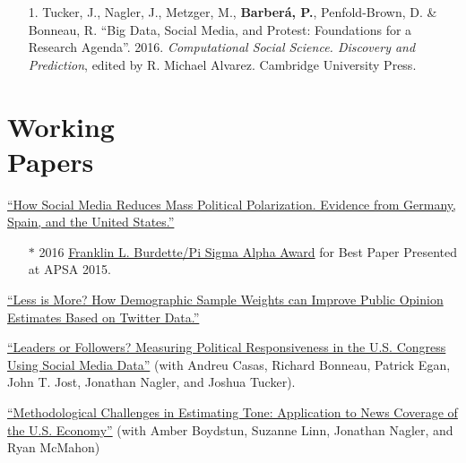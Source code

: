 \documentclass[margin,line,11pt]{resume}
\begin{document}
\begin{resume}
\begin{itemize}[leftmargin=5.5mm]
\item[1.] Tucker, J., Nagler, J., Metzger, M., \textbf{Barber\'{a}, P.}, Penfold-Brown, D. \& Bonneau, R. ``Big Data, Social Media, and Protest: Foundations for a Research Agenda''. 2016. \textit{Computational Social Science. Discovery and Prediction}, edited by R. Michael Alvarez. Cambridge University Press.
\end{itemize}

\newpage

    \section{\mysidestyle Working\\Papers} 
    
\href{http://www.pablobarbera.com/static/barbera_polarization_APSA.pdf}{``How Social Media Reduces Mass Political Polarization. Evidence from Germany, Spain, and the United States.''} 
\begin{itemize}
\item[] $\ast$ 2016 \href{http://www.apsanet.org/PROGRAMS/APSA-Awards/Franklin-L-Burdette-Pi-Sigma-Alpha-Award}{Franklin L. Burdette/Pi Sigma Alpha Award} for Best Paper Presented at APSA 2015.
\end{itemize}

\href{http://pablobarbera.com/static/less-is-more.pdf}{``Less is More? How Demographic Sample Weights can Improve Public Opinion Estimates Based on Twitter Data.''}

\href{http://pablobarbera.com/static/barbera_twitter_responsiveness.pdf}{``Leaders or Followers? Measuring Political Responsiveness in the U.S. Congress Using Social Media Data''} (with Andreu Casas, Richard Bonneau, Patrick Egan, John T. Jost, Jonathan Nagler, and Joshua Tucker).

\href{http://politics.as.nyu.edu/docs/IO/2798/econmedia_mpsa2016_methods_rvBBLMN.pdf}{``Methodological Challenges in Estimating Tone: Application to News Coverage of the U.S. Economy''} (with Amber Boydstun, Suzanne Linn, Jonathan Nagler, and Ryan McMahon)



\end{resume}
\end{document}
